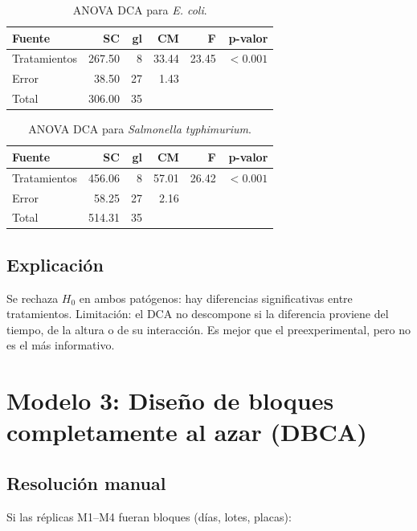 \documentclass[12pt,a4paper]{article}
\begin{document}
\begin{table}[H]
\centering
\caption{ANOVA DCA para \textit{E. coli}.}
\begin{tabular}{lrrrrr}
\toprule
\textbf{Fuente} & \textbf{SC} & \textbf{gl} & \textbf{CM} & \textbf{F} & \textbf{p-valor}\\
\midrule
Tratamientos & 267.50 & 8 & 33.44 & 23.45 & $<0.001$\\
Error & 38.50 & 27 & 1.43 & &\\
Total & 306.00 & 35 & & &\\
\bottomrule
\end{tabular}
\end{table}

\begin{table}[H]
\centering
\caption{ANOVA DCA para \textit{Salmonella typhimurium}.}
\begin{tabular}{lrrrrr}
\toprule
\textbf{Fuente} & \textbf{SC} & \textbf{gl} & \textbf{CM} & \textbf{F} & \textbf{p-valor}\\
\midrule
Tratamientos & 456.06 & 8 & 57.01 & 26.42 & $<0.001$\\
Error & 58.25 & 27 & 2.16 & &\\
Total & 514.31 & 35 & & &\\
\bottomrule
\end{tabular}
\end{table}

\subsection{Explicación}

Se rechaza $H_0$ en ambos patógenos: hay diferencias significativas entre tratamientos. Limitación: el DCA no descompone si la diferencia proviene del tiempo, de la altura o de su interacción. Es mejor que el preexperimental, pero no es el más informativo.

\section{Modelo 3: Diseño de bloques completamente al azar (DBCA)}

\subsection{Resolución manual}

Si las réplicas M1--M4 fueran bloques (días, lotes, placas):
\end{document}
